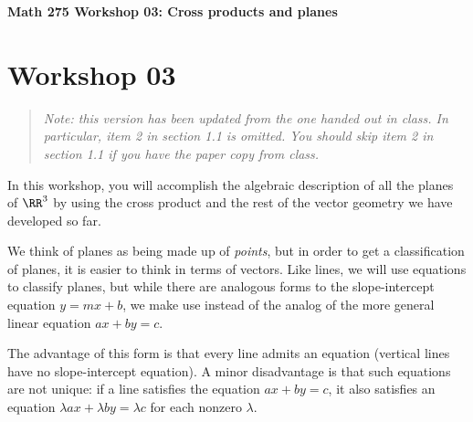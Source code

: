\documentclass[12pt]{exam}
\begin{document}
\noindent
\textbf{{\large Math 275 \hfill Workshop 03: Cross products and planes}}

\noindent
{}

\noindent
{}

\noindent

\section{Workshop 03}

\begin{quote}
\emph{Note: this version has been updated from the one handed out in class.
In particular, item 2 in section 1.1 is omitted. You should skip
item 2 in section 1.1 if you have the paper copy from class.}
\end{quote}

In this workshop, you will accomplish the algebraic description of all
the planes of $\RR^3$ by using the cross product and the rest of the
vector geometry we have developed so far.


We think of planes as being made up of \emph{points}, but in order to
get a classification of planes, it is easier to think in terms of
vectors. Like lines, we will use equations to classify planes, but while
there are analogous forms to the slope-intercept equation $y = mx + b$,
we make use instead of the analog of the more general linear equation
$ax + by = c$.

The advantage of this form is that every line admits an equation
(vertical lines have no slope-intercept equation). A minor disadvantage
is that such equations are not unique: if a line satisfies the equation
$ax + by = c$, it also satisfies an equation
$\lambda ax + \lambda by = \lambda c$ for each nonzero $\lambda$.
\end{document}

